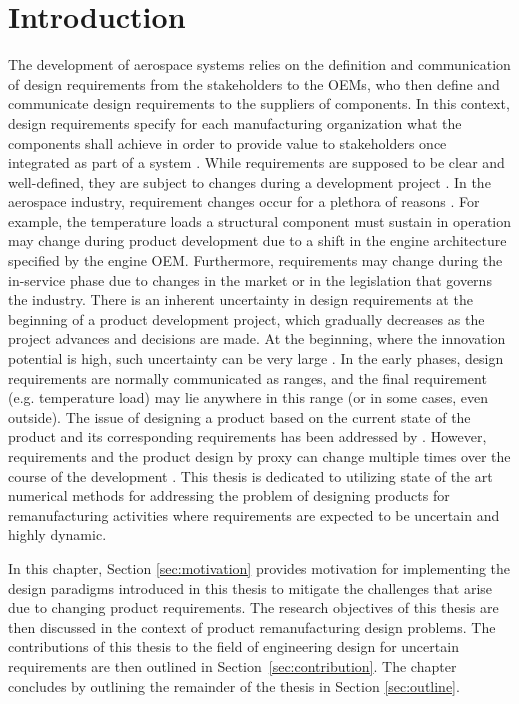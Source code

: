 \chapter{Introduction}
\label{ch:intro}

The development of aerospace systems relies on the definition and communication of design requirements from the stakeholders to the \acp{OEM}, who then define and communicate design requirements to the suppliers of components. In this context, design requirements specify for each manufacturing organization what the components shall achieve in order to provide value to stakeholders once integrated as part of a system \cite{Blanchard1981}. While requirements are supposed to be clear and well-defined, they are subject to changes during a development project \cite{Peterson2007}. In the aerospace industry, requirement changes occur for a plethora of reasons \cite{Boeing2013,Eckert2004}. For example, the temperature loads a structural component must sustain in operation may change during product development due to a shift in the engine architecture specified by the engine \ac{OEM}. Furthermore, requirements may change during the in-service phase due to changes in the market or in the legislation that governs the industry. There is an inherent uncertainty in design requirements at the beginning of a product development project, which gradually decreases as the project advances and decisions are made. At the beginning, where the innovation potential is high, such uncertainty can be very large \cite{ullman2009mechanical}. In the early phases, design requirements are normally communicated as ranges, and the final requirement (e.g. temperature load) may lie anywhere in this range (or in some cases, even outside). The issue of designing a product based on the current state of the product and its corresponding requirements has been addressed by \citeauthor{Alhandawi2020} \cite{Alhandawi2020}. However, requirements and the product design by proxy can change multiple times over the course of the development \cite{Eckert2019}. This thesis is dedicated to utilizing state of the art numerical methods for addressing the problem of designing products for remanufacturing activities where requirements are expected to be uncertain and highly dynamic.

In this chapter, Section \ref{sec:motivation} provides motivation for implementing the design para\-digms introduced in this thesis to mitigate the challenges that arise due to changing product requirements. The research objectives of this thesis are then discussed in the context of product remanufacturing design problems. The contributions of this thesis to the field of engineering design for uncertain requirements are then outlined in Section~\ref{sec:contribution}. The chapter concludes by outlining the remainder of the thesis in Section \ref{sec:outline}.


